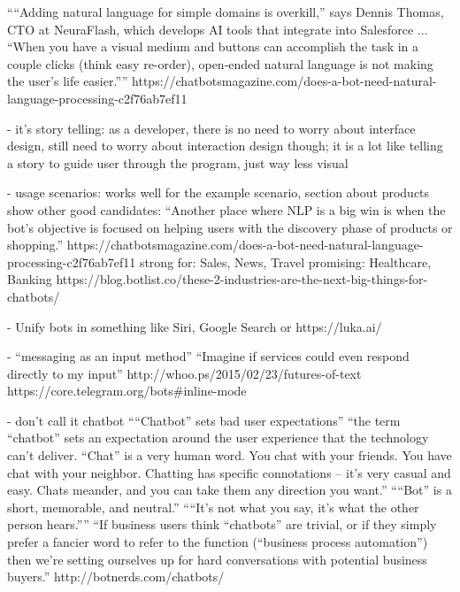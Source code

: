   ``“Adding natural language for simple domains is overkill,” says Dennis Thomas, CTO at NeuraFlash, which develops AI tools that integrate into Salesforce ... “When you have a visual medium and buttons can accomplish the task in a couple clicks (think easy re-order), open-ended natural language is not making the user’s life easier.”''
  https://chatbotsmagazine.com/does-a-bot-need-natural-language-processing-c2f76ab7ef11


- it's story telling:
  as a developer, there is no need to worry about interface design,
  still need to worry about interaction design though;
  it is a lot like telling a story to guide user through the program,
  just way less visual



- usage scenarios:
  works well for the example scenario,
  section about products show other good candidates:
  ``Another place where NLP is a big win is when the bot’s objective is focused on helping users with the discovery phase of products or shopping.''
  https://chatbotsmagazine.com/does-a-bot-need-natural-language-processing-c2f76ab7ef11
  strong for: Sales, News, Travel
  promising: Healthcare, Banking
  https://blog.botlist.co/these-2-industries-are-the-next-big-things-for-chatbots/

- Unify bots in something like Siri, Google Search or https://luka.ai/

- ``messaging as an input method''
  ``Imagine if services could even respond directly to my input''
  http://whoo.ps/2015/02/23/futures-of-text
  https://core.telegram.org/bots#inline-mode

- don't call it chatbot
  ``“Chatbot” sets bad user expectations''
  ``the term “chatbot” sets an expectation around the user experience that the technology can’t deliver.  “Chat” is a very human word. You chat with your friends. You have chat with your neighbor. Chatting has specific connotations – it’s very casual and easy. Chats meander, and you can take them any direction you want.''
  ``“Bot” is a short, memorable, and neutral.''
  ``“It’s not what you say, it’s what the other person hears.”''
  ``If business users think “chatbots” are trivial, or if they simply prefer a fancier word to refer to the function (“business process automation”) then we’re setting ourselves up for hard conversations with potential business buyers.''
  http://botnerds.com/chatbots/

